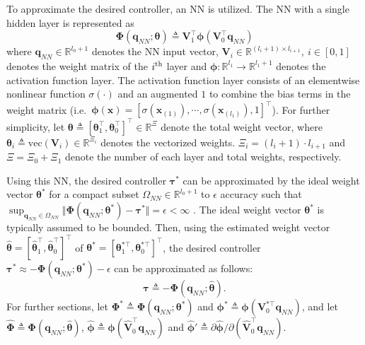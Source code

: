 \documentclass[letterpaper, 10 pt, conference]{ieeeconf}  %
\newcommand\ie{\textrm{i.e.\ }}
\newcommand\R{\mathbb{R}}
\newcommand*{\mv}[1]{\boldsymbol{#1}}
\newcommand*{\mm}[1]{\boldsymbol{#1}}
\begin{document}
To approximate the desired controller, an NN is utilized.
The NN with a single hidden layer is represented as 
\begin{equation}
    \mv \Phi({\mv q_{NN}};\mv \theta)\triangleq \mm V_1^\top \mv \phi(\mm V_0^\top {\mv q_{NN}})
\end{equation}
where ${\mv q_{NN}}\in\R^{l_0+1}$ denotes the NN input vector, $\mm V_i\in\R^{(l_i+1)\times l_{i+1}},\ i\in[0,1]$ denotes the weight matrix of the $i\textsuperscript{th}$ layer and $\mv \phi:\R^{l_1}\to\R^{l_1+1}$ denotes the activation function layer.
The activation function layer consists of an elementwise nonlinear function $\sigma(\cdot)$ and an augmented $1$ to combine the bias terms in the weight matrix (\ie $\mv \phi(\mv x) = [\sigma(\mv x_{(1)}),\cdots, \sigma(\mv x_{(l_1)}), 1]^\top $).
For further simplicity, let $\mv \theta\triangleq[\mv \theta_1^\top ,\mv \theta_0^\top ]^\top \in\R^{\Xi}$ denote the total weight vector, where $\mv \theta_i\triangleq \text{vec}(\mm V_i)\in\R^{\Xi_i}$ denotes the vectorized weights.
$\Xi_i=(l_i+1)\cdot l_{i+1}$ and $\Xi=\Xi_0+\Xi_1$ denote the number of each layer and total weights, respectively.

Using this NN, the desired controller $\mv \tau^*$ can be approximated by the ideal weight vector $\mv \theta^*$ for a compact subset $\Omega_{NN}\in\R^{l_0+1}$ to $\epsilon$ accuracy such that $\sup_{{\mv q_{NN}}\in\Omega_{NN}} \allowbreak \Vert\mv \Phi({\mv q_{NN}};\mv \theta^*) - \mv \tau^*\Vert=\epsilon<\infty$ \cite{RN35}.
The ideal weight vector $\mv \theta^*$ is typically assumed to be bounded.
Then, using the estimated weight vector $\hat{\mv \theta}=[\hat{\mv \theta}_1^\top ,\hat{\mv \theta}_0^\top ]^\top $ of $\mv \theta^*=[\mv \theta_1^{*\top},\mv \theta_0^{*\top}]^\top $, the desired controller $\mv \tau^*\approx -\mv \Phi(\mv q_{NN};\mv \theta^*)-\epsilon$ can be approximated as follows:
\begin{equation}
    \mv \tau \triangleq -\mv \Phi({\mv q_{NN}};\hat{\mv \theta}).
    \label{eq. control law}
\end{equation}
For further sections, let $\mv \Phi^*\triangleq\mv \Phi({\mv q_{NN}};\mv \theta^*)$ and $\mv \phi^* \triangleq\mv \phi(\mm V_0^{*\top}{\mv q_{NN}})$, and let $\hat{\mv \Phi}\triangleq{\mv \Phi}({\mv q_{NN}};\hat{\mv \theta})$, $\hat{\mv \phi} \triangleq\mv \phi(\hat {\mm V}_0^{\top}{\mv q_{NN}})$ and $\hat{\mv \phi}' \triangleq \partial \hat{\mv \phi}/\partial (\hat {\mm V}_0^\top \mv q_{NN})$.
\end{document}
